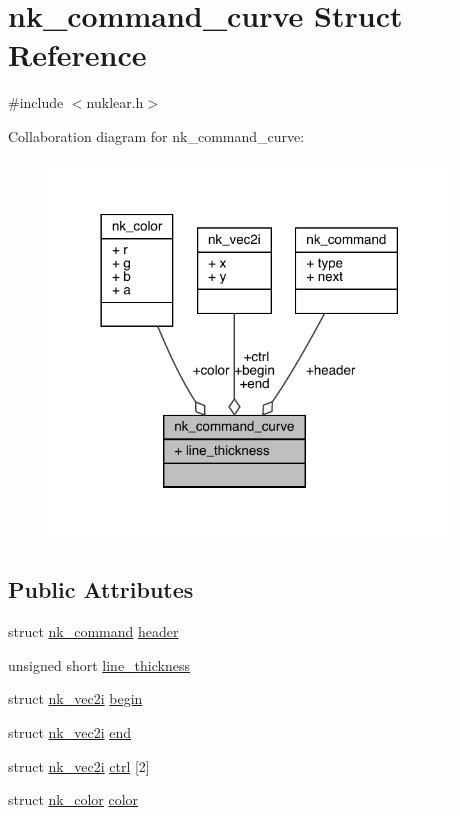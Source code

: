 \hypertarget{structnk__command__curve}{}\section{nk\+\_\+command\+\_\+curve Struct Reference}
\label{structnk__command__curve}


{\ttfamily \#include $<$nuklear.\+h$>$}



Collaboration diagram for nk\+\_\+command\+\_\+curve\+:
\nopagebreak
\begin{figure}[H]
\begin{center}
\leavevmode
\includegraphics[width=302pt]{structnk__command__curve__coll__graph}
\end{center}
\end{figure}
\subsection*{Public Attributes}
\begin{DoxyCompactItemize}
\item 
struct \mbox{\hyperlink{structnk__command}{nk\+\_\+command}} \mbox{\hyperlink{structnk__command__curve_a4a83c7e8c5ba8b4340238f9a7401461d}{header}}
\item 
unsigned short \mbox{\hyperlink{structnk__command__curve_ae780aa8003d662d9873cba9527b0a02c}{line\+\_\+thickness}}
\item 
struct \mbox{\hyperlink{structnk__vec2i}{nk\+\_\+vec2i}} \mbox{\hyperlink{structnk__command__curve_ac90ce7358b1ed8d529d2cbaec92c2fd7}{begin}}
\item 
struct \mbox{\hyperlink{structnk__vec2i}{nk\+\_\+vec2i}} \mbox{\hyperlink{structnk__command__curve_aa69e2aea76ec8cadbf55fd27557d6582}{end}}
\item 
struct \mbox{\hyperlink{structnk__vec2i}{nk\+\_\+vec2i}} \mbox{\hyperlink{structnk__command__curve_a237c28ec24d044902526a37ba721d325}{ctrl}} \mbox{[}2\mbox{]}
\item 
struct \mbox{\hyperlink{structnk__color}{nk\+\_\+color}} \mbox{\hyperlink{structnk__command__curve_a9e3bd7fb76b0ca7be0fd1a215bf28858}{color}}
\end{DoxyCompactItemize}



